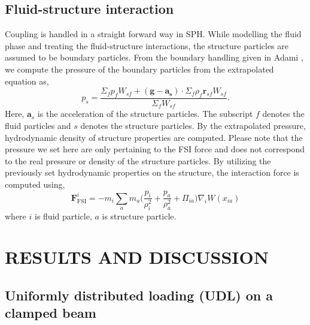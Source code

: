 \documentclass[10pt, conference]{FMFP2022}
\newcommand{\ten}[1]{\ensuremath{\mathbf{#1}}}
\begin{document}
\subsection{\textbf{Fluid-structure interaction}}\label{subsec:fsi}
Coupling is handled in a straight forward way in SPH. While modelling the fluid
phase and treating the fluid-structure interactions, the structure particles are
assumed to be boundary particles. From the boundary handling given in Adami
\cite{Adami2012}, we compute the pressure of the boundary particles from
the extrapolated equation as,
\begin{equation}
  \label{eq:pressure-bc}
  p_s = \frac{\Sigma_f p_f W_{sf} + (\ten{g} - \ten{a}_{\ten{s}}) \cdot \Sigma_f
    \rho_f \ten{r}_{sf} W_{sf}}{\Sigma_f W_{sf}}.
\end{equation}
Here, $\ten{a}_s$ is the acceleration of the structure particles. The subscript
$f$ denotes the fluid particles and $s$ denotes the structure particles. By the
extrapolated pressure, hydrodynamic density of structure properties are
computed. Please note that the pressure we set here are only pertaining to the
FSI force and does not correspond to the real pressure or density of the
structure particles. By utilizing the previously set hydrodynamic properties on
the structure, the interaction force is computed using,
\begin{equation}
  \ten{F}_{\text{FSI}}^i = -m_i \sum_{a} m_a \bigg(\frac{p_i}{\rho_{i}^2} +
  \frac{p_a}{\rho_{a}^2} + \Pi_{ia} \bigg) \nabla_{i} W(x_{ia})
\end{equation}
where $i$ is fluid particle, $a$ is structure particle.


\section{\textbf{RESULTS AND DISCUSSION}}\label{sec3}

\subsection{Uniformly distributed loading (UDL) on a clamped beam}
\label{sec:udl}
\end{document}
